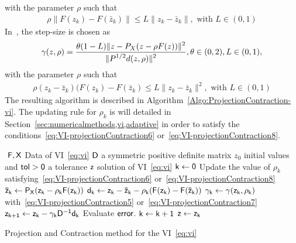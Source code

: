 with the parameter $\rho$ such that
\begin{equation}
  \label{eq:VI-projectionContraction6}
  \begin{array}{lcl}
    \rho \|F(z_k) - F(\bar z_k)\| \leq L \|z_k - \bar z_k\|, \text{ with } L \in (0,1)
  \end{array}
\end{equation}
In~\citep{Solodov.Tseng1996}, the step-size is chosen as
\begin{equation}
  \label{eq:VI-projectionContraction7}
  \begin{array}{lcl}
    \gamma (z,\rho) = \Frac{\theta (1-L) \| z - P_X(z-\rho F(z))\|^2} {\|P^{1/2}d(z,\rho)\|^2}, \theta \in (0,2), L\in (0,1),
  \end{array}
\end{equation}
with the parameter $\rho$ such that
\begin{equation}
  \label{eq:VI-projectionContraction8}
  \begin{array}{lcl}
    \rho (z_k-\bar z_k)(F(z_k) - F(\bar z_k) \leq L \|z_k - \bar z_k\|^2, \text{ with } L \in (0,1)
  \end{array}
\end{equation}
The resulting algorithm is described in Algorithm~\ref{Algo:ProjectionContraction-vi}. The updating rule for $\rho_k$ is will detailed in Section~\ref{sec:numericalmethods,vi,adaptive} in order to satisfy the conditions~\eqref{eq:VI-projectionContraction6} or~\eqref{eq:VI-projectionContraction8}.


\begin{algorithm}
  \begin{algorithmic}
    {\sf
      \STATE $ $
      \REQUIRE $\sf F,X$ Data of VI~\eqref{eq:vi}
      \REQUIRE $\sf D$ a symmetric positive definite matrix
      \REQUIRE $z_0$ initial values and $\sf tol >0$ a tolerance
      \ENSURE  $\sf z$ solution of VI~\eqref{eq:vi}
      \STATE   $\sf k \leftarrow 0$ 
      \STATE Update the value of $\rho_k$ satisfying~\eqref{eq:VI-projectionContraction6} or~\eqref{eq:VI-projectionContraction8}
      \STATE $\sf \bar z_{k} \leftarrow P_X(z_k-\rho_k F(z_k))$
      \STATE $\sf d_k  \leftarrow  z_k - \bar z_k - \rho_k (F(z_k) - F(\bar z_k)) $
      \STATE $\sf \gamma_k \leftarrow \gamma(z_k,\rho_k)$ with~\eqref{eq:VI-projectionContraction5} or~\eqref{eq:VI-projectionContraction7}
      \STATE $\sf z_{k+1} \leftarrow  z_k - \gamma_k D^{-1} d_k$
      \STATE Evaluate $\sf error$.
      \STATE $\sf k \leftarrow k+1$
      \ENDWHILE
      \STATE $\sf z \leftarrow z_{k}$ 
    }
  \end{algorithmic}
  \caption{Projection and Contraction method for the VI~\eqref{eq:vi}}  \label{Algo:ProjectionContraction-vi}
\end{algorithm}

